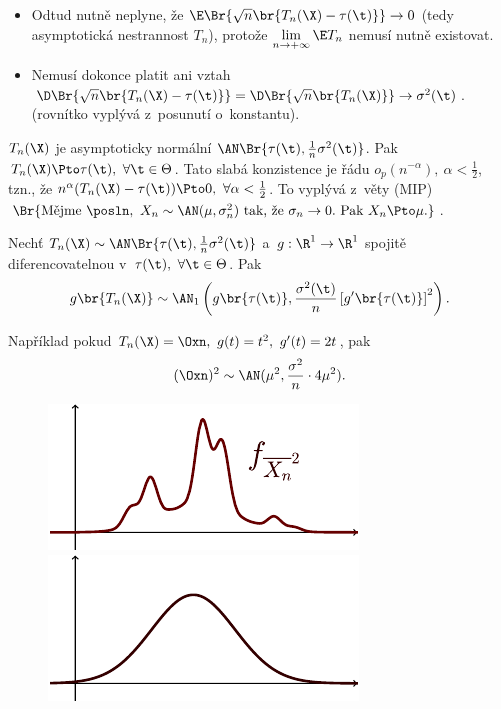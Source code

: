 \begin{remark}
	\begin{itemize}
		\item Odtud nutně neplyne, že $\E\Br{\sqrt{n}\br{T_n(\X)-\tau(\t)}}\to 0 $ (tedy asymptotická nestrannost $T_n$), protože $\lim\limits_{n\to+\infty}\E T_n$ nemusí nutně existovat.
		\item Nemusí dokonce platit ani vztah $\D\Br{\sqrt{n}\br{T_n(\X)-\tau(\t)}}=\D\Br{\sqrt{n}\br{T_n(\X)}}\to\sigma^2(\t)$. (rovnítko vyplývá z~posunutí o~konstantu).
	\end{itemize}
\end{remark}

\begin{theorem}
	$T_n(\X)$ je asymptoticky normální $\AN\Br{\tau(\t),\frac{1}{n}\sigma^2(\t)}$. Pak $T_n(\X)\Pto\tau(\t),~\forall\t\in\Theta$. 
Tato slabá konzistence je řádu $o_p(n^{-\alpha}),~\alpha<\frac{1}{2}$, tzn., že $n^\alpha(T_n(\X)-\tau(\t))\Pto0,~\forall\alpha<\frac{1}{2}$. To vyplývá z~věty (MIP) $\Br{\text{Mějme }\posln,~X_n\sim\AN(\mu,\sigma_n^2)\text{ tak, že }\sigma_n\to 0.\text{ Pak }X_n\Pto \mu.}$.
\end{theorem}

\begin{theorem}\label{lamatko}
	Nechť $T_n(\X)\sim\AN\Br{\tau(\t),\frac{1}{n}\sigma^2(\t)}$ a~$g:\R^1\to\R^1$ spojitě diferencovatelnou v~$\tau(\t),~\forall\t\in\Theta$. Pak $$g\br{T_n(\X)}\sim\AN_1\left( g\br{\tau(\t)},\frac{\sigma^2(\t)}{n}\left[ g'\br{\tau(\t)} \right]^2 \right).$$
\end{theorem}
\begin{example}
	Například pokud $T_n(\X)=\Oxn,~g(t)=t^2,~g'(t)=2t$, pak$$ (\Oxn)^2\sim\AN(\mu^2,\frac{\sigma^2}{n}\cdot 4\mu^2). $$ 
	\begin{figure}[h]
		\centering
		\includegraphics[width=0.3\linewidth]{Images/fxn1} 
		\includegraphics[width=0.3\linewidth]{Images/fxn2}
		\label{fig:fxn1}
	\end{figure}
\end{example}
